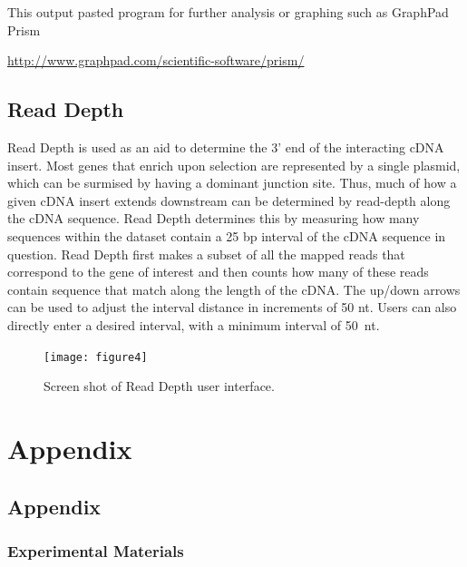 \documentclass[11pt,fleqn]{book} %
\newcommand{\ReadDepth}{{\color{Bittersweet} Read Depth }}
\begin{document}
This output pasted program for further analysis or graphing such as GraphPad Prism

\vspace{10pt}
\href{http://www.graphpad.com/scientific-software/prism/}{http://www.graphpad.com/scientific-software/prism/}

\chapter{\ReadDepth}

\ReadDepth is used as an aid to determine the 3’ end of the interacting cDNA insert.  Most genes that enrich upon selection are represented by a single plasmid, which can be surmised by having a dominant junction site.  Thus, much of how a given cDNA insert extends downstream can be determined by read-depth along the cDNA sequence. \ReadDepth determines this by measuring how many sequences within the dataset contain a 25 bp interval of the cDNA sequence in question. \ReadDepth first makes a subset of all the mapped reads that correspond to the gene of interest and then counts how many of these reads contain sequence that match along the length of the cDNA. 
The up/down arrows can be used to adjust the interval distance in increments of 50 nt.  Users can also directly enter a desired interval, with a minimum interval of 50~nt.

\begin{figure}[!ht]
    \centering
    \texttt{[image: figure4]}
    \caption{Screen shot of Read Depth user interface.}
    \label{fig:blast_query_screen_shot2}
\end{figure}

\cleardoublepage

\part{Appendix}



\chapter{Appendix}

\section{Experimental Materials}
\end{document}
